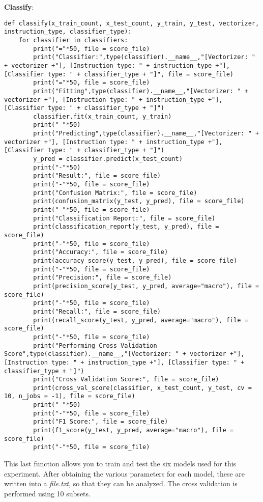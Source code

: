 \documentclass[11pt]{article}
\begin{document}
\textbf{Classify}:
\begin{lstlisting}
def classify(x_train_count, x_test_count, y_train, y_test, vectorizer, instruction_type, classifier_type):
	for classifier in classifiers:
		print("="*50, file = score_file)
		print("Classifier:",type(classifier).__name__,"[Vectorizer: " + vectorizer +"], [Instruction type: " + instruction_type +"], [Classifier type: " + classifier_type + "]", file = score_file)
		print("="*50, file = score_file)
		print("Fitting",type(classifier).__name__,"[Vectorizer: " + vectorizer +"], [Instruction type: " + instruction_type +"], [Classifier type: " + classifier_type + "]")
		classifier.fit(x_train_count, y_train)
		print("-"*50)
		print("Predicting",type(classifier).__name__,"[Vectorizer: " + vectorizer +"], [Instruction type: " + instruction_type +"], [Classifier type: " + classifier_type + "]")
		y_pred = classifier.predict(x_test_count)
		print("-"*50)
		print("Result:", file = score_file)
		print("-"*50, file = score_file)
		print("Confusion Matrix:", file = score_file)
		print(confusion_matrix(y_test, y_pred), file = score_file)
		print("-"*50, file = score_file)
		print("Classification Report:", file = score_file)
		print(classification_report(y_test, y_pred), file = score_file)
		print("-"*50, file = score_file)
		print("Accuracy:", file = score_file)
		print(accuracy_score(y_test, y_pred), file = score_file)
		print("-"*50, file = score_file)
		print("Precision:", file = score_file)
		print(precision_score(y_test, y_pred, average="macro"), file = score_file)
		print("-"*50, file = score_file)
		print("Recall:", file = score_file)
		print(recall_score(y_test, y_pred, average="macro"), file = score_file)
		print("-"*50, file = score_file)
		print("Performing Cross Validation Score",type(classifier).__name__,"[Vectorizer: " + vectorizer +"], [Instruction type: " + instruction_type +"], [Classifier type: " + classifier_type + "]")
		print("Cross Validation Score:", file = score_file)
		print(cross_val_score(classifier, x_test_count, y_test, cv = 10, n_jobs = -1), file = score_file)
		print("-"*50)
		print("-"*50, file = score_file)
		print("F1 Score:", file = score_file)
		print(f1_score(y_test, y_pred, average="macro"), file = score_file)
		print("-"*50, file = score_file)
\end{lstlisting}
This last function allows you to train and test the six models used for this experiment. After obtaining the various parameters for each model, these are written into a \textit{file.txt}, so that they can be analyzed. The cross validation is performed using 10 subsets.
\end{document}
